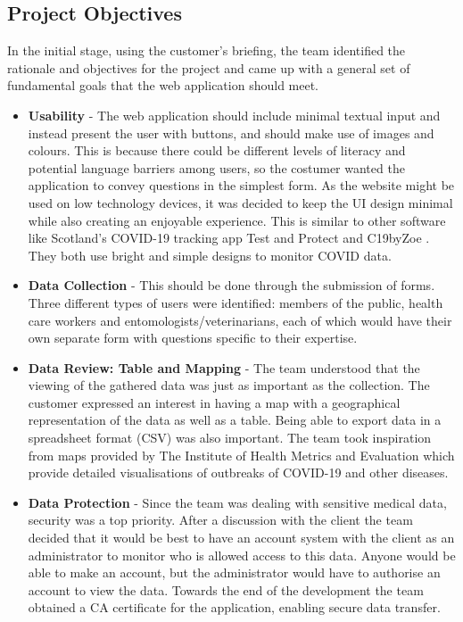\documentclass{l3proj}
\begin{document}
\subsection{Project Objectives}
In the initial stage, using the customer's briefing, the team identified the rationale and objectives for the project and came up with a general set of fundamental goals that the web application should meet.
\begin{itemize}
    \item \textbf{Usability} - The web application should include minimal textual input and instead present the user with buttons, and should make use of images and colours. This is because there could be different levels of literacy and potential language barriers among users, so the costumer wanted the application to convey questions in the simplest form. As the website might be used on low technology devices, it was decided to keep the UI design minimal while also creating an enjoyable experience. This is similar to other software like Scotland's COVID-19 tracking app Test and Protect \cite{TestandProtectScotlandApp} and C19byZoe \cite{C19byZoe}. They both use bright and simple designs to monitor COVID data. 
    
    \item \textbf{Data Collection} - This should be done through the submission of forms. Three different types of users were identified: members of the public, health care workers and entomologists/veterinarians, each of which would have their own separate form with questions specific to their expertise. 
    
    \item \textbf{Data Review: Table and Mapping} - The team understood that the viewing of the gathered data was just as important as the collection. The customer expressed an interest in having a map with a geographical representation of the data as well as a table. Being able to export data in a spreadsheet format (CSV) was also important. The team took inspiration from maps provided by The Institute of Health Metrics and Evaluation \cite{IHME} which provide detailed visualisations of outbreaks of COVID-19 and other diseases.
    
    \item \textbf{Data Protection} - Since the team was dealing with sensitive medical data, security was a top priority. After a discussion with the client the team decided that it would be best to have an account system with the client as an administrator to monitor who is allowed access to this data. Anyone would be able to make an account, but the administrator would have to authorise an account to view the data. Towards the end of the development the team obtained a CA certificate for the application, enabling secure data transfer.
\end{itemize}
\end{document}
